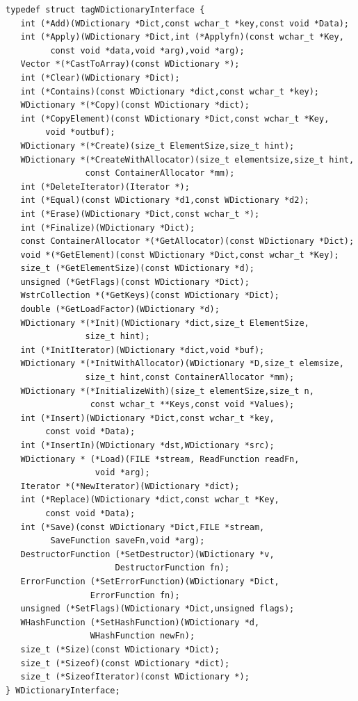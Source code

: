 \begin{verbatim}
typedef struct tagWDictionaryInterface {
   int (*Add)(WDictionary *Dict,const wchar_t *key,const void *Data);
   int (*Apply)(WDictionary *Dict,int (*Applyfn)(const wchar_t *Key,
         const void *data,void *arg),void *arg);
   Vector *(*CastToArray)(const WDictionary *);
   int (*Clear)(WDictionary *Dict);
   int (*Contains)(const WDictionary *dict,const wchar_t *key);
   WDictionary *(*Copy)(const WDictionary *dict);
   int (*CopyElement)(const WDictionary *Dict,const wchar_t *Key,
        void *outbuf);
   WDictionary *(*Create)(size_t ElementSize,size_t hint);
   WDictionary *(*CreateWithAllocator)(size_t elementsize,size_t hint,
                const ContainerAllocator *mm);
   int (*DeleteIterator)(Iterator *);
   int (*Equal)(const WDictionary *d1,const WDictionary *d2);
   int (*Erase)(WDictionary *Dict,const wchar_t *);
   int (*Finalize)(WDictionary *Dict);
   const ContainerAllocator *(*GetAllocator)(const WDictionary *Dict);
   void *(*GetElement)(const WDictionary *Dict,const wchar_t *Key);
   size_t (*GetElementSize)(const WDictionary *d);
   unsigned (*GetFlags)(const WDictionary *Dict);
   WstrCollection *(*GetKeys)(const WDictionary *Dict);
   double (*GetLoadFactor)(WDictionary *d);
   WDictionary *(*Init)(WDictionary *dict,size_t ElementSize,
                size_t hint);
   int (*InitIterator)(WDictionary *dict,void *buf);
   WDictionary *(*InitWithAllocator)(WDictionary *D,size_t elemsize,
                size_t hint,const ContainerAllocator *mm);
   WDictionary *(*InitializeWith)(size_t elementSize,size_t n,
                 const wchar_t **Keys,const void *Values);
   int (*Insert)(WDictionary *Dict,const wchar_t *key,
        const void *Data);
   int (*InsertIn)(WDictionary *dst,WDictionary *src);
   WDictionary * (*Load)(FILE *stream, ReadFunction readFn,
                  void *arg);
   Iterator *(*NewIterator)(WDictionary *dict);
   int (*Replace)(WDictionary *dict,const wchar_t *Key,
        const void *Data);
   int (*Save)(const WDictionary *Dict,FILE *stream,
         SaveFunction saveFn,void *arg);
   DestructorFunction (*SetDestructor)(WDictionary *v,
                      DestructorFunction fn);
   ErrorFunction (*SetErrorFunction)(WDictionary *Dict,
                 ErrorFunction fn);
   unsigned (*SetFlags)(WDictionary *Dict,unsigned flags);
   WHashFunction (*SetHashFunction)(WDictionary *d,
                 WHashFunction newFn);
   size_t (*Size)(const WDictionary *Dict);
   size_t (*Sizeof)(const WDictionary *dict);
   size_t (*SizeofIterator)(const WDictionary *);
} WDictionaryInterface;
\end{verbatim}
